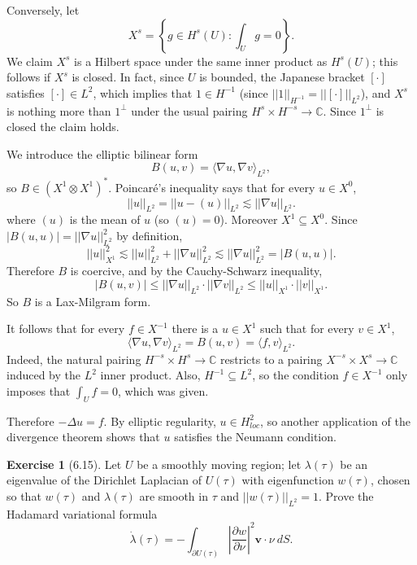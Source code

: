 \documentclass[10pt]{article}
\newcommand{\CC}{\mathbb{C}}
\theoremstyle{definition}
\newtheorem{exer}{Exercise}
\begin{document}
Conversely, let
$$X^s = \left\{g \in H^s(U): \int_U g = 0\right\}.$$
We claim $X^s$ is a Hilbert space under the same inner product as $H^s(U)$; this follows if $X^s$ is closed.
In fact, since $U$ is bounded, the Japanese bracket $[\cdot]$ satisfies $[\cdot] \in L^2$, which implies that $1 \in H^{-1}$ (since $||1||_{H^{-1}} = ||[\cdot]||_{L^2}$), and $X^s$ is nothing more than $1^\perp$ under the usual pairing $H^s \times H^{-s} \to \CC$.
Since $1^\perp$ is closed the claim holds.

We introduce the elliptic bilinear form
$$B(u, v) = \langle \nabla u, \nabla v\rangle_{L^2},$$
so $B \in (X^1 \otimes X^1)^*$.
Poincar\'e's inequality says that for every $u \in X^0$,
$$||u||_{L^2} = ||u - (u)||_{L^2} \lesssim ||\nabla u||_{L^2}.$$
where $(u)$ is the mean of $u$ (so $(u) = 0$). Moreover $X^1 \subseteq X^0$.
Since $|B(u, u)| = ||\nabla u||_{L^2}^2$ by definition,
$$||u||_{X^1}^2 \lesssim ||u||_{L^2}^2 + ||\nabla u||_{L^2}^2 \lesssim ||\nabla u||_{L^2}^2 = |B(u, u)|.$$
Therefore $B$ is coercive, and by the Cauchy-Schwarz inequality,
$$|B(u, v)| \leq ||\nabla u||_{L^2} \cdot ||\nabla v||_{L^2} \leq ||u||_{X^1} \cdot ||v||_{X^1}.$$
So $B$ is a Lax-Milgram form.

It follows that for every $f \in X^{-1}$ there is a $u \in X^1$ such that for every $v \in X^1$,
$$\langle \nabla u, \nabla v\rangle_{L^2} = B(u, v) = \langle f, v\rangle_{L^2}.$$
Indeed, the natural pairing $H^{-s} \times H^s \to \CC$ restricts to a pairing $X^{-s} \times X^s \to \CC$ induced by the $L^2$ inner product.
Also, $H^{-1} \subseteq L^2$, so the condition $f \in X^{-1}$ only imposes that $\int_U f = 0$, which was given.

Therefore $-\Delta u = f$. By elliptic regularity, $u \in H^2_{loc}$, so another application of the divergence theorem shows that $u$ satisfies the Neumann condition.

\begin{exer}[6.15]
Let $U$ be a smoothly moving region; let $\lambda(\tau)$ be an eigenvalue of the Dirichlet Laplacian of $U(\tau)$ with eigenfunction $w(\tau)$, chosen so that $w(\tau)$ and $\lambda(\tau)$ are smooth in $\tau$ and $||w(\tau)||_{L^2} = 1$. Prove the Hadamard variational formula
$$\dot \lambda(\tau) = -\int_{\partial U(\tau)} \left|\frac{\partial w}{\partial \nu}\right|^2 \mathbf v\cdot \nu~dS.$$
\end{exer}
\end{document}
